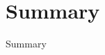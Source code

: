 \documentclass[
  9pt,
  ignorenonframetext,
]{beamer}
\begin{document}
\hypertarget{summary}{%
\section{Summary}\label{summary}}

\begin{frame}{Summary}
\protect\hypertarget{summary-1}{}
\end{frame}
\end{document}
